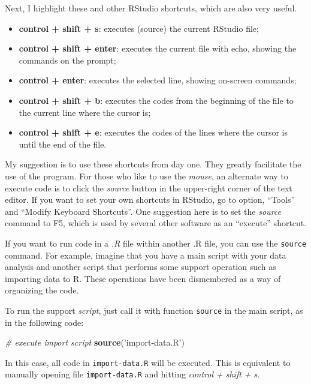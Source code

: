 \documentclass[11pt,]{book}
\newenvironment{Shaded}{\begin{snugshade}}{\end{snugshade}}
\newcommand{\KeywordTok}[1]{\textcolor[rgb]{0.27,0.27,0.27}{\textbf{#1}}}
\newcommand{\StringTok}[1]{\textcolor[rgb]{0.5,0.5,0.5}{#1}}
\newcommand{\CommentTok}[1]{\textcolor[rgb]{0.56,0.35,0.01}{\textit{#1}}}
\newcommand{\NormalTok}[1]{#1}
\providecommand{\tightlist}{%
  \setlength{\itemsep}{0pt}\setlength{\parskip}{0pt}}
\begin{document}
Next, I highlight these and other RStudio shortcuts, which are also very
useful.

\begin{itemize}
\tightlist
\item
  \textbf{control + shift + s}: executes (source) the current RStudio
  file;
\item
  \textbf{control + shift + enter}: executes the current file with echo,
  showing the commands on the prompt;
\item
  \textbf{control + enter}: executes the selected line, showing
  on-screen commands;
\item
  \textbf{control + shift + b}: executes the codes from the beginning of
  the file to the current line where the cursor is;
\item
  \textbf{control + shift + e}: executes the codes of the lines where
  the cursor is until the end of the file.
\end{itemize}

My suggestion is to use these shortcuts from day one. They greatly
facilitate the use of the program. For those who like to use the
\emph{mouse}, an alternate way to execute code is to click the
\emph{source} button in the upper-right corner of the text editor. If
you want to set your own shortcuts in RStudio, go to option, ``Tools''
and ``Modify Keyboard Shortcuts''. One suggestion here is to set the
\emph{source} command to F5, which is used by several other software as
an ``execute'' shortcut.

If you want to run code in a \emph{.R} file within another .R file, you
can use the \texttt{source} command. For example, imagine that you have
a main script with your data analysis and another script that performs
some support operation such as importing data to R. These operations
have been dismembered as a way of organizing the code.

To run the support \emph{script}, just call it with function
\texttt{source} in the main script, as in the following code:

\begin{Shaded}
\begin{Highlighting}[]
\CommentTok{# execute import script}
\KeywordTok{source}\NormalTok{(}\StringTok{'import-data.R'}\NormalTok{)}
\end{Highlighting}
\end{Shaded}

In this case, all code in \texttt{import-data.R} will be executed. This
is equivalent to manually opening file \texttt{import-data.R} and
hitting \emph{control + shift + s}.
\end{document}
